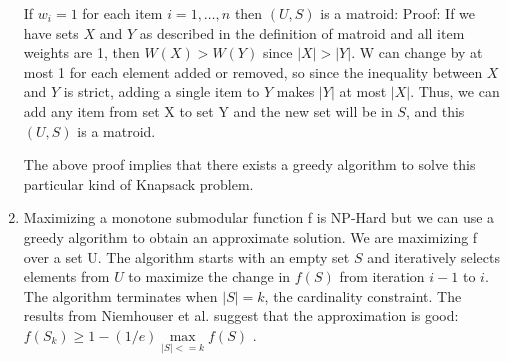 \documentclass[]{article}
\begin{document}
\begin{enumerate}
	If $w_i = 1$ for each item $i=1,\dots,n$ then $(U,S)$ is a matroid:
	Proof:
	If we have sets $X$ and $Y$ as described in the definition of matroid and all item weights are 1, then $W(X) > W(Y)$ since $|X| > |Y|$. W can change by at most 1 for each element added or removed, so since the inequality between $X$ and $Y$ is strict, adding a single item to $Y$ makes $|Y|$ at most $|X|$.  Thus, we can add any item from set X to set Y and the new set will be in $S$, and this $(U,S)$ is a matroid.
	
	The above proof implies that there exists a greedy algorithm to solve this particular kind of Knapsack problem.
	
	\item Maximizing a monotone submodular function f is NP-Hard but we can use a greedy algorithm to obtain an approximate solution. We are maximizing f over a set U. The algorithm starts with an empty set $S$ and iteratively selects elements from $U$ to maximize the change in $f(S)$ from iteration $i-1$ to $i$. The algorithm terminates when $|S| = k$, the cardinality constraint. The results from Niemhouser et al. suggest that the approximation is good: $f(S_k)\ge 1 - (1/e)  \max\limits_{|S|<=k} f(S)$ \cite{krause}.
	
\end{enumerate}
	


\end{document}
